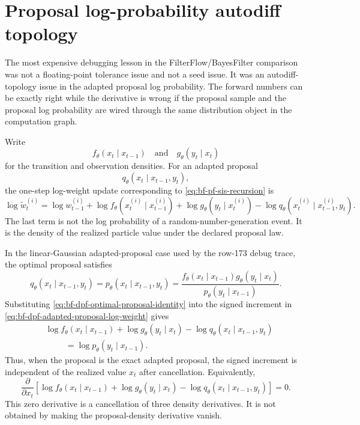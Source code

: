\section{Proposal log-probability autodiff topology}
\label{sec:bf-dpf-proposal-logprob-ad-topology}

The most expensive debugging lesson in the FilterFlow/BayesFilter comparison
was not a floating-point tolerance issue and not a seed issue.  It was an
autodiff-topology issue in the adapted proposal log probability.  The forward
numbers can be exactly right while the derivative is wrong if the proposal
sample and the proposal log probability are wired through the same distribution
object in the computation graph.

Write
\[
  f_\theta(x_t\mid x_{t-1})
  \quad\text{and}\quad
  g_\theta(y_t\mid x_t)
\]
for the transition and observation densities.  For an adapted proposal
\[
  q_\theta(x_t\mid x_{t-1},y_t),
\]
the one-step log-weight update corresponding to
\eqref{eq:bf-pf-sis-recursion} is
\begin{equation}
\label{eq:bf-dpf-adapted-proposal-log-weight}
  \log \tilde w_t^{(i)}
  =
  \log w_{t-1}^{(i)}
  + \log f_\theta(x_t^{(i)}\mid x_{t-1}^{(i)})
  + \log g_\theta(y_t\mid x_t^{(i)})
  - \log q_\theta(x_t^{(i)}\mid x_{t-1}^{(i)},y_t).
\end{equation}
The last term is not the log probability of a random-number-generation event.
It is the density of the realized particle value under the declared proposal
law.

In the linear-Gaussian adapted-proposal case used by the row-173 debug trace,
the optimal proposal satisfies
\begin{equation}
\label{eq:bf-dpf-optimal-proposal-identity}
  q_\theta(x_t\mid x_{t-1},y_t)
  =
  p_\theta(x_t\mid x_{t-1},y_t)
  =
  \frac{
    f_\theta(x_t\mid x_{t-1})g_\theta(y_t\mid x_t)
  }{
    p_\theta(y_t\mid x_{t-1})
  } .
\end{equation}
Substituting \eqref{eq:bf-dpf-optimal-proposal-identity} into the signed
increment in \eqref{eq:bf-dpf-adapted-proposal-log-weight} gives
\begin{align}
\label{eq:bf-dpf-optimal-proposal-cancellation}
 &\log f_\theta(x_t\mid x_{t-1})
  + \log g_\theta(y_t\mid x_t)
  - \log q_\theta(x_t\mid x_{t-1},y_t) \nonumber\\
 &\hspace{1cm}
  =
  \log p_\theta(y_t\mid x_{t-1}).
\end{align}
Thus, when the proposal is the exact adapted proposal, the signed increment is
independent of the realized value $x_t$ after cancellation.  Equivalently,
\[
  \frac{\partial}{\partial x_t}
  \left[
    \log f_\theta(x_t\mid x_{t-1})
    + \log g_\theta(y_t\mid x_t)
    - \log q_\theta(x_t\mid x_{t-1},y_t)
  \right]
  =0 .
\]
This zero derivative is a cancellation of three density derivatives.  It is not
obtained by making the proposal-density derivative vanish.

